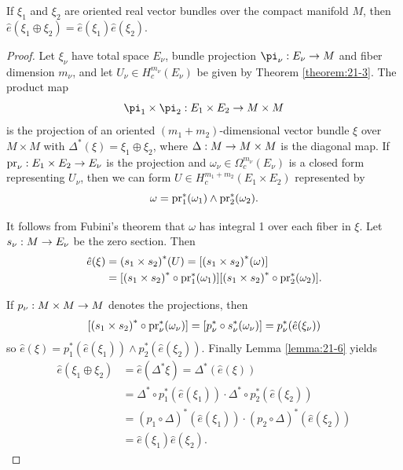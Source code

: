 \begin{lemma}\label{lemma:21-7}
  If ${\xi }_{1}$ and ${\xi }_{2}$ are oriented real vector bundles over the compact manifold $M$, 
  then $\hat{e}( {{\xi }_{1} \oplus  {\xi }_{2}})  = \hat{e}( {\xi }_{1}) \hat{e}( {\xi }_{2})$.
\end{lemma}


\begin{proof}
  Let ${\xi }_{\nu }$ have total space ${E}_{\nu }$, bundle projection ${\pi }_{\nu } : {E}_{\nu } \ra  M$ 
  and fiber dimension ${m}_{\nu }$, and let ${U}_{\nu } \in  H_c^{{m}_{\nu }}( {E}_{\nu })$ be given 
  by Theorem \ref{theorem:21-3}. The product map
  \[
    {\pi }_{1} \times  {\pi }_{2} : {E}_{1} \times  {E}_{2} \ra  M \times  M
  \]
  is the projection of an oriented $( {{m}_{1} + {m}_{2}})$-dimensional vector bundle $\xi$ over $M \times  M$ 
  with ${\Delta }^*( \xi )  = {\xi }_{1} \oplus  {\xi }_{2}$, where $\Delta  : M \rightarrow  M \times  M$ is the 
  diagonal map. If ${\mathrm{pr}}_{\nu } : {E}_{1} \times  {E}_{2} \rightarrow  {E}_{\nu }$ is the projection 
  and ${\omega }_{\nu } \in  {\Omega }_{c}^{{m}_{\nu }}( {E}_{\nu })$ is a closed form representing ${U}_{\nu }$, 
  then we can form $U \in  H_c^{{m}_{1} + {m}_{2}}( {{E}_{1} \times  {E}_{2}})$ represented by
  \[
    \omega  = {\mathrm{pr}}_{1}^*( {\omega }_{1})  \land  {\ensuremath{\mathrm{pr}}}_{2}^*( {\omega }_{2}).
  \]
  
  It follows from Fubini’s theorem that $\omega$ has integral 1 over each fiber in $\xi$. Let $s_\nu:M\rightarrow E_\nu$ 
  be the zero section. Then
  \begin{align*}
      \hat{e}( \xi ) 
      & = { ({s}_{1} \times  {s}_{2}) }^*( U)  
        = [ {{( {s}_{1} \times  {s}_{2}) }^*( \omega ) }] \\
      & = [ {{( {s}_{1} \times  {s}_{2}) }^* \circ {\ensuremath{\mathrm{pr}}}_{1}^*( {\omega }_{1}) }]  
          [ {{( {s}_{1} \times  {s}_{2}) }^* \circ {\ensuremath{\mathrm{pr}}}_{2}^*( {\omega }_{2}) }].  
  \end{align*}
  
  If $p_\nu : M \times  M \rightarrow  M$ denotes the projections, then
  \[
    [{{( {s}_{1} \times  {s}_{2}) }^* \circ  {\ensuremath{\mathrm{pr}}}_{\nu }^*( {\omega }_{\nu }) }] 
    = [  {p_\nu^* \circ  {s}_{\nu }^*( {\omega }_{\nu }) }] 
    = p_\nu^*( {\hat{e}( {\xi }_{\nu }) })
  \]
  so $\hat{e}( \xi )  = {p}_{1}^*( {\hat{e}( {\xi }_{1}) })  \land  {p}_{2}^*( {\hat{e}( {\xi }_{2}) })$. 
  Finally Lemma \ref{lemma:21-6} yields
  \begin{align*}
    \hat{e}( {{\xi }_{1} \oplus  {\xi }_{2}}) 
    & = \hat{e}( {{\Delta }^*\xi }) = {\Delta }^*( {\hat{e}( \xi ) }) \\
    & = {\Delta }^* \circ  {p}_{1}^*( {\hat{e}( {\xi }_{1}) })\cdot{\Delta }^* \circ  {p}_{2}^*( {\hat{e}( {\xi }_{2}) }) \\
    & = {( {p}_{1} \circ  \Delta ) }^*( {\hat{e}( {\xi }_{1}) })\cdot{( {p}_{2} \circ  \Delta ) }^*( {\hat{e}( {\xi }_{2}) }) \\
    & = \hat{e}( {\xi }_{1}) \hat{e}( {\xi }_{2}).
  \end{align*}  
\end{proof}

